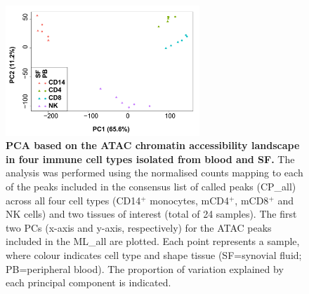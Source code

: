 \begin{figure}[htbp]
\centering
\includegraphics[width=0.65\textwidth]{./Results3/pdfs/ATAC_PSA_all_DESEq2_PCA}
\caption[PCA based on the ATAC chromatin accessibility landscape in four immune cell types isolated from blood and synovial fluid.]{\textbf{PCA based on the ATAC chromatin accessibility landscape in four immune cell types isolated from blood and SF.} The analysis was performed using the normalised counts mapping to each of the peaks included in the consensus list of called peaks (CP\_all) across all four cell types (CD14$^+$ monocytes, mCD4$^+$, mCD8$^+$ and NK cells) and two tissues of interest (total of 24 samples). The first two PCs (x-axis and y-axis, respectively) for the ATAC peaks included in the ML\_all are plotted. Each point represents a sample, where colour indicates cell type and shape tissue (SF=synovial fluid; PB=peripheral blood). The proportion of variation explained by each principal component is indicated.}
\label{figure:PsA_FAST_ATAC_PCA}
\end{figure}




